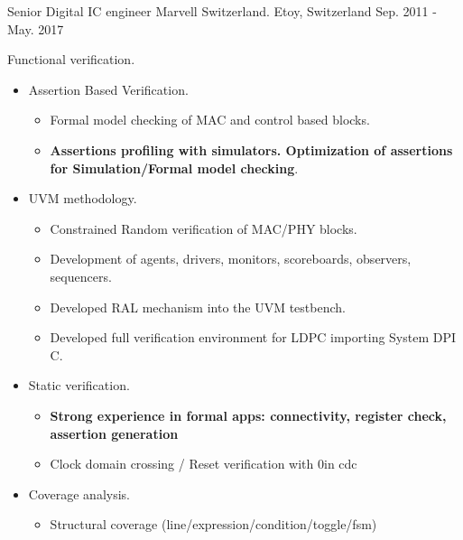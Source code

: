 \begin{cventries}

  \cventry
    {Senior Digital IC engineer} %
    {Marvell Switzerland.} %
    {Etoy, Switzerland} %
    {Sep. 2011 - May. 2017} %
    {
      \begin{cvitems} %
        \item {Functional verification.}
        \begin{itemize}
          \item {Assertion Based Verification.}
          \begin{itemize}
            \item {Formal model checking of MAC and control based blocks.}
            \item {\textbf{Assertions profiling with simulators. Optimization of assertions for Simulation/Formal model checking}.}
          \end{itemize}
          \item {UVM methodology.}
          \begin{itemize}
            \item {Constrained Random verification of MAC/PHY blocks.}
            \item {Development of agents, drivers, monitors, scoreboards, observers, sequencers.}
            \item {Developed RAL mechanism into the UVM testbench.}
            \item {Developed full verification environment for LDPC importing System DPI C.}
          \end{itemize}
          \item {Static verification.}
          \begin{itemize}
            \item {\textbf{Strong experience in formal apps: connectivity, register check, assertion generation}}
            \item {Clock domain crossing / Reset verification with 0in cdc}
          \end{itemize}
          \item {Coverage analysis.}
          \begin{itemize}
            \item {Structural coverage (line/expression/condition/toggle/fsm)}

\end{itemize}
\end{itemize}
\end{cvitems}}
\end{cventries}
